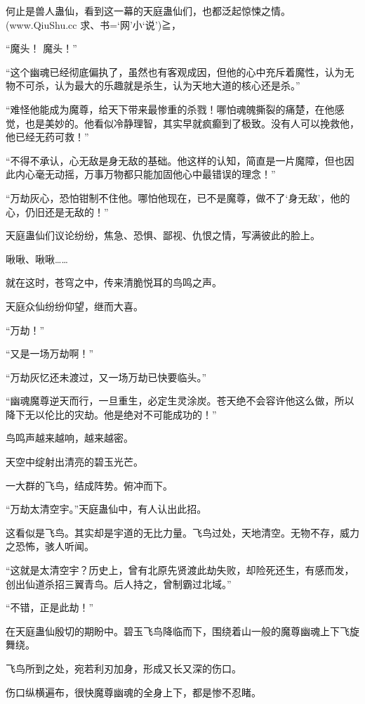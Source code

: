 
\begin{this_body}

何止是兽人蛊仙，看到这一幕的天庭蛊仙们，也都泛起惊悚之情。(www.QiuShu.cc 求、书=‘网’小‘说’)≧，

“魔头！ 魔头！”

“这个幽魂已经彻底偏执了，虽然也有客观成因，但他的心中充斥着魔性，认为无物不可杀，认为最大的乐趣就是杀生，认为天地大道的核心还是杀。”

“难怪他能成为魔尊，给天下带来最惨重的杀戮！哪怕魂魄撕裂的痛楚，在他感觉，也是美妙的。他看似冷静理智，其实早就疯癫到了极致。没有人可以挽救他，他已经无药可救！”

“不得不承认，心无敌是身无敌的基础。他这样的认知，简直是一片魔障，但也因此内心毫无动摇，万事万物都只能加固他心中最错误的理念！”

“万劫灰心，恐怕钳制不住他。哪怕他现在，已不是魔尊，做不了‘身无敌’，他的心，仍旧还是无敌的！”

天庭蛊仙们议论纷纷，焦急、恐惧、鄙视、仇恨之情，写满彼此的脸上。

啾啾、啾啾……

就在这时，苍穹之中，传来清脆悦耳的鸟鸣之声。

天庭众仙纷纷仰望，继而大喜。

“万劫！”

“又是一场万劫啊！”

“万劫灰忆还未渡过，又一场万劫已快要临头。”

“幽魂魔尊逆天而行，一旦重生，必定生灵涂炭。苍天绝不会容许他这么做，所以降下无以伦比的灾劫。他是绝对不可能成功的！”

鸟鸣声越来越响，越来越密。

天空中绽射出清亮的碧玉光芒。

一大群的飞鸟，结成阵势。俯冲而下。

“万劫太清空宇。”天庭蛊仙中，有人认出此招。

这看似是飞鸟。其实却是宇道的无比力量。飞鸟过处，天地清空。无物不存，威力之恐怖，骇人听闻。

“这就是太清空宇？历史上，曾有北原先贤渡此劫失败，却险死还生，有感而发，创出仙道杀招三翼青鸟。后人持之，曾制霸过北域。”

“不错，正是此劫！”

在天庭蛊仙殷切的期盼中。碧玉飞鸟降临而下，围绕着山一般的魔尊幽魂上下飞旋舞绕。

飞鸟所到之处，宛若利刃加身，形成又长又深的伤口。

伤口纵横遍布，很快魔尊幽魂的全身上下，都是惨不忍睹。


\end{this_body}
